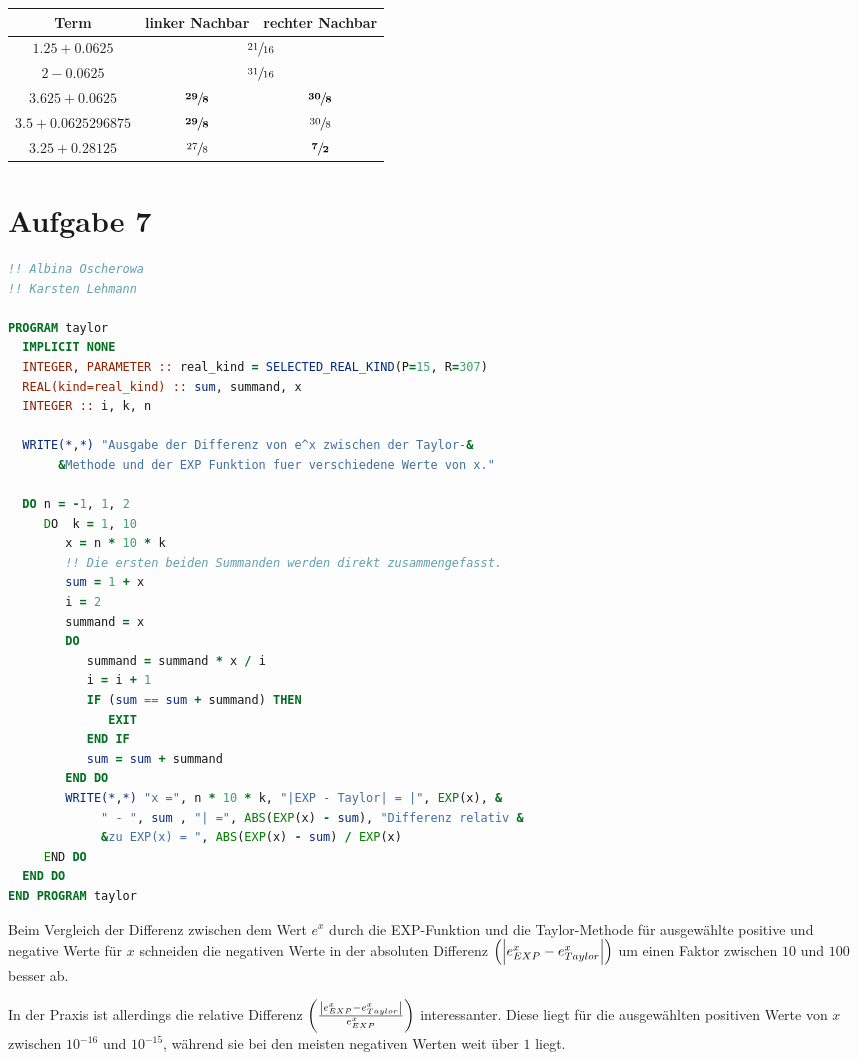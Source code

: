 \documentclass{article}
\begin{document}
\begin{enumerate}[a)]
  \begin{tabular}{ccc}
    Term                 & linker Nachbar            & rechter Nachbar \\
    \hline
    $1.25 + 0.0625$      & \multicolumn{2}{c}{$\sfrac{21}{16}$} \\
    $2 - 0.0625$         & \multicolumn{2}{c}{$\sfrac{31}{16}$} \\
    $3.625 + 0.0625$     & $\sfrac{\bm{29}}{\bm{8}}$ & $\sfrac{\bm{30}}{\bm{8}}$ \\
    $3.5 + 0.0625296875$ & $\sfrac{\bm{29}}{\bm{8}}$ & $\sfrac{30}{8}$ \\
    $3.25 + 0.28125$     & $\sfrac{27}{8}$           & $\sfrac{\bm{7}}{\bm{2}}$ \\                      
  \end{tabular}
\end{enumerate}

\newpage
\section*{Aufgabe 7}

\begin{lstlisting}[language=Fortran, showstringspaces=false]
!! Albina Oscherowa
!! Karsten Lehmann

PROGRAM taylor
  IMPLICIT NONE
  INTEGER, PARAMETER :: real_kind = SELECTED_REAL_KIND(P=15, R=307)
  REAL(kind=real_kind) :: sum, summand, x
  INTEGER :: i, k, n

  WRITE(*,*) "Ausgabe der Differenz von e^x zwischen der Taylor-&
       &Methode und der EXP Funktion fuer verschiedene Werte von x."
  
  DO n = -1, 1, 2
     DO  k = 1, 10
        x = n * 10 * k
        !! Die ersten beiden Summanden werden direkt zusammengefasst.
        sum = 1 + x
        i = 2
        summand = x
        DO
           summand = summand * x / i
           i = i + 1
           IF (sum == sum + summand) THEN
              EXIT
           END IF
           sum = sum + summand
        END DO
        WRITE(*,*) "x =", n * 10 * k, "|EXP - Taylor| = |", EXP(x), &
             " - ", sum , "| =", ABS(EXP(x) - sum), "Differenz relativ &
             &zu EXP(x) = ", ABS(EXP(x) - sum) / EXP(x) 
     END DO
  END DO
END PROGRAM taylor
\end{lstlisting}

Beim Vergleich der Differenz zwischen dem Wert $e^x$ durch die EXP-Funktion und die
Taylor-Methode für ausgewählte positive und negative Werte für $x$ schneiden die
negativen Werte in der absoluten Differenz $\left(\abs{e^x_{EXP} - e^x_{Taylor}}\right)$
um einen Faktor zwischen $10$ und $100$ besser ab.

In der Praxis ist allerdings die relative Differenz
$\left(\frac{\abs{e^x_{EXP} - e^x_{Taylor}}}{e^x_{EXP}}\right)$
interessanter.
Diese liegt für die ausgewählten positiven Werte von $x$ zwischen $10^{-16}$ und $10^{-15}$,
während sie bei den meisten negativen Werten weit über $1$ liegt.
\end{document}
